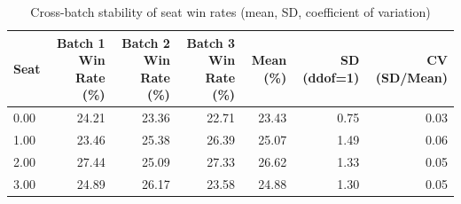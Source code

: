 \begin{table}[htbp]
\centering
\caption{Cross-batch stability of seat win rates (mean, SD, coefficient of variation)}
\label{tab:seat_cv}
\begin{tabular}{lrrrrrr}
\toprule
Seat & Batch 1 Win Rate (\%) & Batch 2 Win Rate (\%) & Batch 3 Win Rate (\%) & Mean (\%) & SD (ddof=1) & CV (SD/Mean) \\
\midrule
0.00 & 24.21 & 23.36 & 22.71 & 23.43 & 0.75 & 0.03 \\
1.00 & 23.46 & 25.38 & 26.39 & 25.07 & 1.49 & 0.06 \\
2.00 & 27.44 & 25.09 & 27.33 & 26.62 & 1.33 & 0.05 \\
3.00 & 24.89 & 26.17 & 23.58 & 24.88 & 1.30 & 0.05 \\
\bottomrule
\end{tabular}
\end{table}